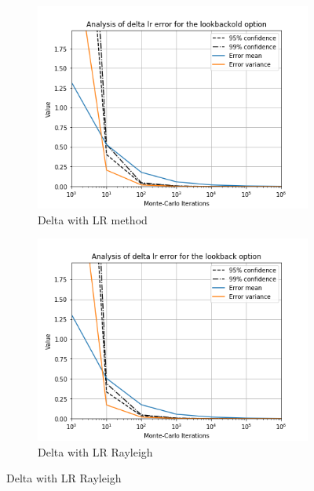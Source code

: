 \documentclass[11pt,a4paper,fleqn]{article}
\begin{document}
\begin{figure}[h!]
  \centering
      \begin{subfigure}[b]{0.45\textwidth}
          \includegraphics[width=\textwidth]{graphs/lookbackolddeltalr.png}
          \caption{Delta with LR method}
      \end{subfigure}
      \begin{subfigure}[b]{0.45\textwidth}
          \includegraphics[width=\textwidth]{graphs/lookbackdeltalr.png}
          \caption{Delta with LR Rayleigh}
      \end{subfigure}


\end{figure}
\end{document}

